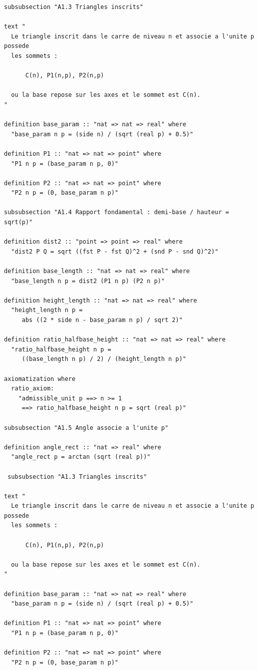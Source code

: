 \documentclass[12pt,a4paper]{article}
\theoremstyle{definition}
\theoremstyle{remark}
\begin{document}
\begin{verbatim}
subsubsection "A1.3 Triangles inscrits"

text "
  Le triangle inscrit dans le carre de niveau n et associe a l'unite p possede
  les sommets :

      C(n), P1(n,p), P2(n,p)

  ou la base repose sur les axes et le sommet est C(n).
"

definition base_param :: "nat => nat => real" where
  "base_param n p = (side n) / (sqrt (real p) + 0.5)"

definition P1 :: "nat => nat => point" where
  "P1 n p = (base_param n p, 0)"

definition P2 :: "nat => nat => point" where
  "P2 n p = (0, base_param n p)"

subsubsection "A1.4 Rapport fondamental : demi-base / hauteur = sqrt(p)"

definition dist2 :: "point => point => real" where
  "dist2 P Q = sqrt ((fst P - fst Q)^2 + (snd P - snd Q)^2)"

definition base_length :: "nat => nat => real" where
  "base_length n p = dist2 (P1 n p) (P2 n p)"

definition height_length :: "nat => nat => real" where
  "height_length n p =
     abs ((2 * side n - base_param n p) / sqrt 2)"

definition ratio_halfbase_height :: "nat => nat => real" where
  "ratio_halfbase_height n p =
     ((base_length n p) / 2) / (height_length n p)"

axiomatization where
  ratio_axiom:
    "admissible_unit p ==> n >= 1
     ==> ratio_halfbase_height n p = sqrt (real p)"

subsubsection "A1.5 Angle associe a l'unite p"

definition angle_rect :: "nat => real" where
  "angle_rect p = arctan (sqrt (real p))"

 subsubsection "A1.3 Triangles inscrits"

text "
  Le triangle inscrit dans le carre de niveau n et associe a l'unite p possede
  les sommets :

      C(n), P1(n,p), P2(n,p)

  ou la base repose sur les axes et le sommet est C(n).
"

definition base_param :: "nat => nat => real" where
  "base_param n p = (side n) / (sqrt (real p) + 0.5)"

definition P1 :: "nat => nat => point" where
  "P1 n p = (base_param n p, 0)"

definition P2 :: "nat => nat => point" where
  "P2 n p = (0, base_param n p)"


\end{verbatim}
\end{document}
